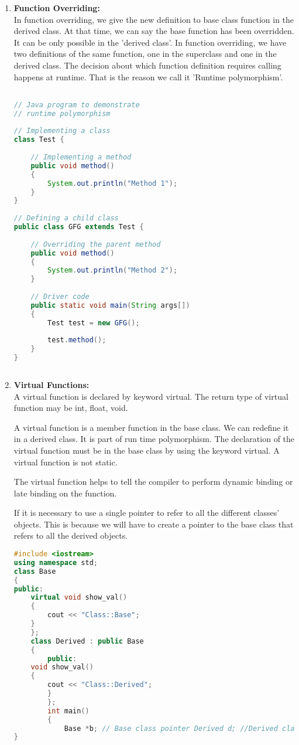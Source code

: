 \documentclass[11pt]{article}
\begin{document}
\begin{enumerate}
	\item \textbf{Function Overriding: }\\
	      In function overriding, we give the new definition to base class function in the derived class. At that time, we can say the base function has been overridden. It can be only possible in the 'derived class'. In function overriding, we have two definitions of the same function, one in the superclass and one in the derived class. The decision about which function definition requires calling happens at runtime. That is the reason we call it 'Runtime polymorphism'.

	      \begin{lstlisting}[language=Java]

// Java program to demonstrate
// runtime polymorphism
 
// Implementing a class
class Test {
 
    // Implementing a method
    public void method()
    {
        System.out.println("Method 1");
    }
}
 
// Defining a child class
public class GFG extends Test {
 
    // Overriding the parent method
    public void method()
    {
        System.out.println("Method 2");
    }
 
    // Driver code
    public static void main(String args[])
    {
        Test test = new GFG();
 
        test.method();
    }
}
	
\end{lstlisting}
	\item \textbf{Virtual Functions: }\\
	      A virtual function is declared by keyword virtual. The return type of virtual function may be int, float, void.

	      A virtual function is a member function in the base class. We can redefine it in a derived class. It is part of run time polymorphism. The declaration of the virtual function must be in the base class by using the keyword virtual. A virtual function is not static.

	      The virtual function helps to tell the compiler to perform dynamic binding or late binding on the function.

	      If it is necessary to use a single pointer to refer to all the different classes' objects. This is because we will have to create a pointer to the base class that refers to all the derived objects.
		  
		  \begin{lstlisting}[language=C++]
#include <iostream>
using namespace std;
class Base
{
public:
	virtual void show_val()
	{
		cout << "Class::Base";
	}
	};
	class Derived : public Base
	{
		public:
	void show_val()
	{
		cout << "Class::Derived";
		}
		};
		int main()
		{
			Base *b; // Base class pointer Derived d; //Derived class object b = &d; b->show_val();   //late Binding
}
\end{lstlisting}
\end{enumerate}
\end{document}
